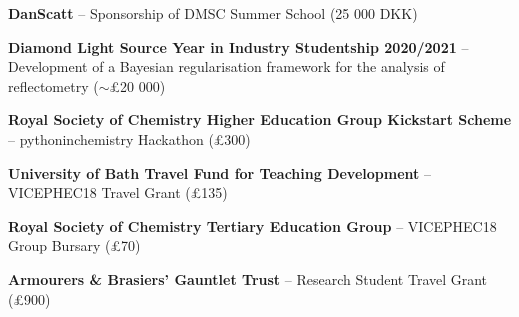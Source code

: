 \begin{cventriesy}
  \cventryy
    {
      \begin{cvitems}
      \item {\textbf{DanScatt} -- Sponsorship of DMSC Summer School (25 000 DKK)}
    \vspace{1mm}
        \item {\textbf{Diamond Light Source Year in Industry Studentship 2020/2021} -- Development of a Bayesian regularisation framework for the analysis of reflectometry ($\sim$£20 000)}
    \vspace{1mm}
        \item {\textbf{Royal Society of Chemistry Higher Education Group Kickstart Scheme} -- pythoninchemistry Hackathon (£300)}
    \vspace{1mm}
        \item {\textbf{University of Bath Travel Fund for Teaching Development} -- VICEPHEC18 Travel Grant (£135)}
    \vspace{1mm}
        \item {\textbf{Royal Society of Chemistry Tertiary Education Group} -- VICEPHEC18 Group Bursary (£70)}
    \vspace{1mm}
        \item {\textbf{Armourers \& Brasiers’ Gauntlet Trust} -- Research Student Travel Grant (£900)}
      \end{cvitems}
    }
\end{cventriesy}
